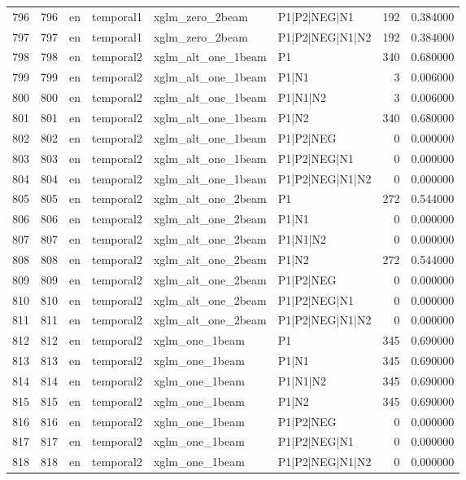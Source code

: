 \begin{tabular}{lrllllrr}
796 & 796 & en & temporal1 & xglm_zero_2beam & P1|P2|NEG|N1 & 192 & 0.384000 \\
797 & 797 & en & temporal1 & xglm_zero_2beam & P1|P2|NEG|N1|N2 & 192 & 0.384000 \\
798 & 798 & en & temporal2 & xglm_alt_one_1beam & P1 & 340 & 0.680000 \\
799 & 799 & en & temporal2 & xglm_alt_one_1beam & P1|N1 & 3 & 0.006000 \\
800 & 800 & en & temporal2 & xglm_alt_one_1beam & P1|N1|N2 & 3 & 0.006000 \\
801 & 801 & en & temporal2 & xglm_alt_one_1beam & P1|N2 & 340 & 0.680000 \\
802 & 802 & en & temporal2 & xglm_alt_one_1beam & P1|P2|NEG & 0 & 0.000000 \\
803 & 803 & en & temporal2 & xglm_alt_one_1beam & P1|P2|NEG|N1 & 0 & 0.000000 \\
804 & 804 & en & temporal2 & xglm_alt_one_1beam & P1|P2|NEG|N1|N2 & 0 & 0.000000 \\
805 & 805 & en & temporal2 & xglm_alt_one_2beam & P1 & 272 & 0.544000 \\
806 & 806 & en & temporal2 & xglm_alt_one_2beam & P1|N1 & 0 & 0.000000 \\
807 & 807 & en & temporal2 & xglm_alt_one_2beam & P1|N1|N2 & 0 & 0.000000 \\
808 & 808 & en & temporal2 & xglm_alt_one_2beam & P1|N2 & 272 & 0.544000 \\
809 & 809 & en & temporal2 & xglm_alt_one_2beam & P1|P2|NEG & 0 & 0.000000 \\
810 & 810 & en & temporal2 & xglm_alt_one_2beam & P1|P2|NEG|N1 & 0 & 0.000000 \\
811 & 811 & en & temporal2 & xglm_alt_one_2beam & P1|P2|NEG|N1|N2 & 0 & 0.000000 \\
812 & 812 & en & temporal2 & xglm_one_1beam & P1 & 345 & 0.690000 \\
813 & 813 & en & temporal2 & xglm_one_1beam & P1|N1 & 345 & 0.690000 \\
814 & 814 & en & temporal2 & xglm_one_1beam & P1|N1|N2 & 345 & 0.690000 \\
815 & 815 & en & temporal2 & xglm_one_1beam & P1|N2 & 345 & 0.690000 \\
816 & 816 & en & temporal2 & xglm_one_1beam & P1|P2|NEG & 0 & 0.000000 \\
817 & 817 & en & temporal2 & xglm_one_1beam & P1|P2|NEG|N1 & 0 & 0.000000 \\
818 & 818 & en & temporal2 & xglm_one_1beam & P1|P2|NEG|N1|N2 & 0 & 0.000000 \\

\end{tabular}
